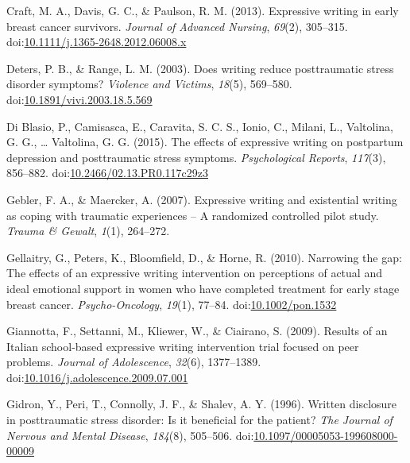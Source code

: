 \documentclass[man]{apa6}
\theoremstyle{definition}
\theoremstyle{definition}
\theoremstyle{definition}
\theoremstyle{remark}
\begin{document}
\leavevmode\hypertarget{ref-Craft2013}{}%
Craft, M. A., Davis, G. C., \& Paulson, R. M. (2013). Expressive writing
in early breast cancer survivors. \emph{Journal of Advanced Nursing},
\emph{69}(2), 305--315.
doi:\href{https://doi.org/10.1111/j.1365-2648.2012.06008.x}{10.1111/j.1365-2648.2012.06008.x}

\leavevmode\hypertarget{ref-Deters2003}{}%
Deters, P. B., \& Range, L. M. (2003). Does writing reduce posttraumatic
stress disorder symptoms? \emph{Violence and Victims}, \emph{18}(5),
569--580.
doi:\href{https://doi.org/10.1891/vivi.2003.18.5.569}{10.1891/vivi.2003.18.5.569}

\leavevmode\hypertarget{ref-Blasio2015a}{}%
Di Blasio, P., Camisasca, E., Caravita, S. C. S., Ionio, C., Milani, L.,
Valtolina, G. G., \ldots{} Valtolina, G. G. (2015). The effects of
expressive writing on postpartum depression and posttraumatic stress
symptoms. \emph{Psychological Reports}, \emph{117}(3), 856--882.
doi:\href{https://doi.org/10.2466/02.13.PR0.117c29z3}{10.2466/02.13.PR0.117c29z3}

\leavevmode\hypertarget{ref-Gebler2007}{}%
Gebler, F. A., \& Maercker, A. (2007). Expressive writing and
existential writing as coping with traumatic experiences -- A randomized
controlled pilot study. \emph{Trauma \& Gewalt}, \emph{1}(1), 264--272.

\leavevmode\hypertarget{ref-Gellaitry2010}{}%
Gellaitry, G., Peters, K., Bloomfield, D., \& Horne, R. (2010).
Narrowing the gap: The effects of an expressive writing intervention on
perceptions of actual and ideal emotional support in women who have
completed treatment for early stage breast cancer.
\emph{Psycho-Oncology}, \emph{19}(1), 77--84.
doi:\href{https://doi.org/10.1002/pon.1532}{10.1002/pon.1532}

\leavevmode\hypertarget{ref-Giannotta2009}{}%
Giannotta, F., Settanni, M., Kliewer, W., \& Ciairano, S. (2009).
Results of an Italian school-based expressive writing intervention trial
focused on peer problems. \emph{Journal of Adolescence}, \emph{32}(6),
1377--1389.
doi:\href{https://doi.org/10.1016/j.adolescence.2009.07.001}{10.1016/j.adolescence.2009.07.001}

\leavevmode\hypertarget{ref-Gidron1996a}{}%
Gidron, Y., Peri, T., Connolly, J. F., \& Shalev, A. Y. (1996). Written
disclosure in posttraumatic stress disorder: Is it beneficial for the
patient? \emph{The Journal of Nervous and Mental Disease},
\emph{184}(8), 505--506.
doi:\href{https://doi.org/10.1097/00005053-199608000-00009}{10.1097/00005053-199608000-00009}
\end{document}
